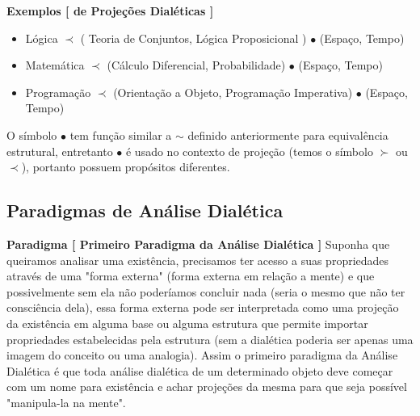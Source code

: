 \documentclass[10pt,a4paper]{report}
\begin{document}
\textbf{Exemplos [ de Projeções Dialéticas ]}

\begin{itemize}
	\item[ (i) ] Lógica $\prec$ ( Teoria de Conjuntos, Lógica Proposicional ) $\bullet$ (Espaço, Tempo)
	\item[ (ii) ] Matemática $\prec$ (Cálculo Diferencial, Probabilidade) $\bullet$ (Espaço, Tempo)
	\item[ (iii) ] Programação $\prec$ (Orientação a Objeto, Programação Imperativa) $\bullet$ (Espaço, Tempo)
\end{itemize}

O símbolo $\bullet$ tem função similar a $\sim$ definido anteriormente para equivalência estrutural, entretanto $\bullet$ é usado no contexto de projeção (temos o símbolo $\succ$ ou $\prec$), portanto possuem propósitos diferentes.


\subsection{Paradigmas de Análise Dialética}

\hspace{\baselineskip}

\textbf{Paradigma [ Primeiro Paradigma da Análise Dialética ]} Suponha que queiramos analisar uma existência, precisamos ter acesso a suas propriedades através de uma "forma externa" (forma externa em relação a mente) e que possivelmente sem ela não poderíamos concluir nada (seria o mesmo que não ter consciência dela), essa forma externa pode ser interpretada como uma projeção da existência em alguma base ou alguma estrutura que permite importar propriedades estabelecidas pela estrutura (sem a dialética poderia ser apenas uma imagem do conceito ou uma analogia). Assim o primeiro paradigma da Análise Dialética é que toda análise dialética de um determinado objeto deve começar com um nome para existência e achar projeções da mesma para que seja possível "manipula-la na mente". \\
\end{document}
